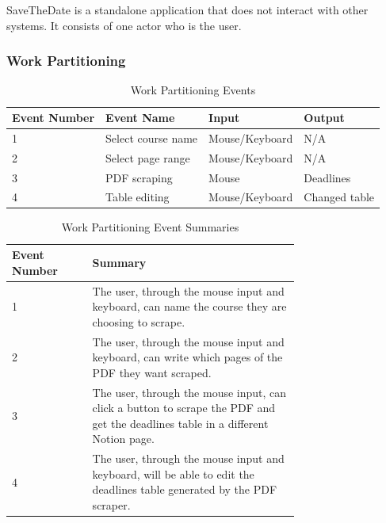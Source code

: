 \documentclass[12pt, titlepage]{article}
\begin{document}
SaveTheDate is a standalone application that does not interact with other systems. It consists of one actor who is the user. 

\pagebreak

\subsubsection{Work Partitioning}

\begin{table}[!ht]
  \begin{center}
    \begin{tabular}{|l|l|l|l|}
      \hline
      Event Number & Event Name         & Input          & Output          \\ \hline
      1            & Select course name & Mouse/Keyboard & N/A             \\ \hline
      2            & Select page range  & Mouse/Keyboard & N/A             \\ \hline
      3            & PDF scraping       & Mouse          & Deadlines       \\ \hline
      4            & Table editing      & Mouse/Keyboard & Changed table   \\ \hline
    \end{tabular}
    \caption{Work Partitioning Events}
  \end{center}
\end{table}


\begin{table}[!htp]
  \begin{center}
    \begin{tabular}{|l|p{0.72\linewidth}|}
      \hline
      Event Number & Summary                             \\ \hline
      1            & The user, through the mouse input and keyboard, can name the course they are choosing to scrape.                                \\ \hline
      2            & The user, through the mouse input and keyboard, can write which pages of the PDF they want scraped.                                 \\ \hline
      3            & The user, through the mouse input, can click a button to scrape the PDF and get the deadlines table in a different Notion page.    \\ \hline
      4            & The user, through the mouse input and keyboard, will be able to edit the deadlines table generated by the PDF scraper.      \\ \hline
      \end{tabular}
      \caption{Work Partitioning Event Summaries}
  \end{center}
\end{table}
\end{document}
